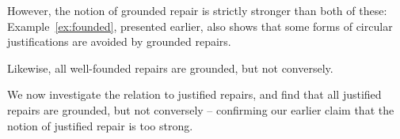 However, the notion of grounded repair is strictly stronger than both of these: Example~\ref{ex:founded}, presented earlier, also shows that some forms of circular justifications are avoided by grounded repairs.

Likewise, all well-founded repairs are grounded, but not conversely.

We now investigate the relation to justified repairs, and find that all justified repairs are grounded, but not conversely -- confirming our earlier claim that the notion of justified repair is too strong.

